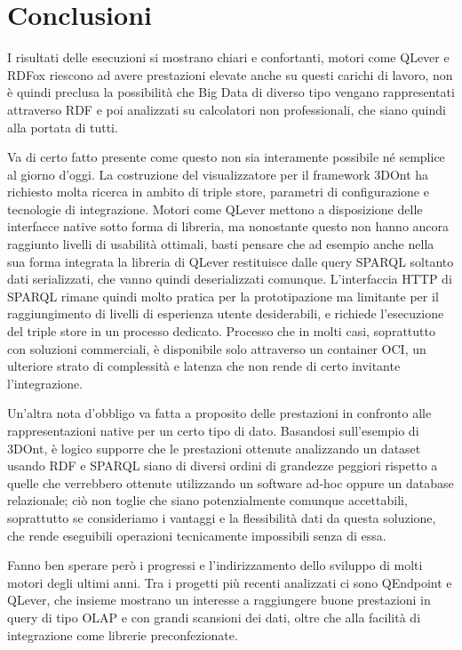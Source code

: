 \chapter{Conclusioni}
\label{cha:conclusions}

I risultati delle esecuzioni si mostrano chiari e confortanti, motori come QLever e RDFox riescono ad avere
prestazioni elevate anche su questi carichi di lavoro, non è quindi preclusa la possibilità che Big Data di diverso tipo
vengano rappresentati attraverso RDF e poi analizzati su calcolatori non professionali, che siano quindi alla portata di tutti.
\par Va di certo fatto presente come questo non sia interamente possibile né semplice al giorno d'oggi. La costruzione
del visualizzatore per il framework 3DOnt ha richiesto molta ricerca in ambito di triple store, parametri di configurazione
e tecnologie di integrazione. Motori come QLever mettono a disposizione delle interfacce native sotto forma di libreria,
ma nonostante questo non hanno ancora raggiunto livelli di usabilità ottimali, basti pensare che ad esempio anche nella sua 
forma integrata la libreria di QLever restituisce dalle query SPARQL soltanto dati serializzati, che vanno quindi deserializzati comunque. 
L'interfaccia HTTP di SPARQL rimane quindi molto pratica per la prototipazione ma limitante per il raggiungimento di
livelli di esperienza utente desiderabili, e richiede l'esecuzione del triple store in un processo dedicato. Processo che
in molti casi, soprattutto con soluzioni commerciali, è disponibile solo attraverso un container OCI, un ulteriore strato
di complessità e latenza che non rende di certo invitante l'integrazione.
\par Un'altra nota d'obbligo va fatta a proposito delle prestazioni in confronto alle rappresentazioni native per un certo tipo di dato.
Basandosi sull'esempio di 3DOnt, è logico supporre che le prestazioni ottenute analizzando un dataset usando RDF e SPARQL siano di
diversi ordini di grandezze peggiori rispetto a quelle che verrebbero ottenute utilizzando un software ad-hoc oppure un database relazionale; 
ciò non toglie che siano potenzialmente comunque accettabili, soprattutto se consideriamo i vantaggi e la flessibilità dati da questa
soluzione, che rende eseguibili operazioni tecnicamente impossibili senza di essa.
\par Fanno ben sperare però i progressi e l'indirizzamento dello sviluppo di molti motori degli ultimi anni. Tra i progetti più recenti
analizzati ci sono QEndpoint e QLever, che insieme mostrano un interesse a raggiungere buone prestazioni in query di tipo
OLAP e con grandi scansioni dei dati, oltre che alla facilità di integrazione come librerie preconfezionate.

